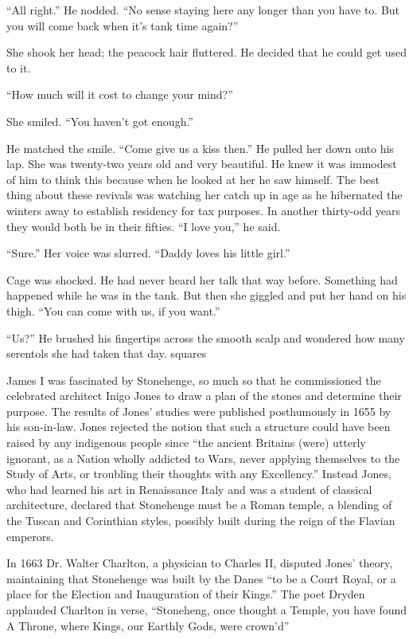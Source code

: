 “All right.” He nodded. “No sense staying here any longer than you have to. But you will come back when it’s tank time again?”

She shook her head; the peacock hair fluttered. He decided that he could get used to it.

“How much will it cost to change your mind?”

She smiled. “You haven’t got enough.”

He matched the smile. “Come give us a kiss then.” He pulled her down onto his lap. She was twenty-two years old and very beautiful. He knew it was immodest of him to think this because when he looked at her he saw himself. The best thing about these revivals was watching her catch up in age as he hibernated the winters away to establish residency for tax purposes. In another thirty-odd years they would both be in their fifties. “I love you,” he said.

“Sure.” Her voice was slurred. “Daddy loves his little girl.”

Cage was shocked. He had never heard her talk that way before. Something had happened while he was in the tank. But then she giggled and put her hand on his thigh. “You can come with us, if you want.”

“Us?” He brushed his fingertips across the smooth scalp and wondered how many serentols she had taken that day.
squares

James I was fascinated by Stonehenge, so much so that he commissioned the celebrated architect Inigo Jones to draw a plan of the stones and determine their purpose. The results of Jones’ studies were published posthumously in 1655 by his son-in-law. Jones rejected the notion that such a structure could have been raised by any indigenous people since “the ancient Britains (were) utterly ignorant, as a Nation wholly addicted to Wars, never applying themselves to the Study of Arts, or troubling their thoughts with any Excellency.” Instead Jones, who had learned his art in Renaissance Italy and was a student of classical architecture, declared that Stonehenge must be a Roman temple, a blending of the Tuscan and Corinthian styles, possibly built during the reign of the Flavian emperors.

In 1663 Dr. Walter Charlton, a physician to Charles II, disputed Jones’ theory, maintaining that Stonehenge was built by the Danes “to be a Court Royal, or a place for the Election and Inauguration of their Kings.” The poet Dryden applauded Charlton in verse, “Stoneheng, once thought a Temple, you have found A Throne, where Kings, our Earthly Gods, were crown’d”


